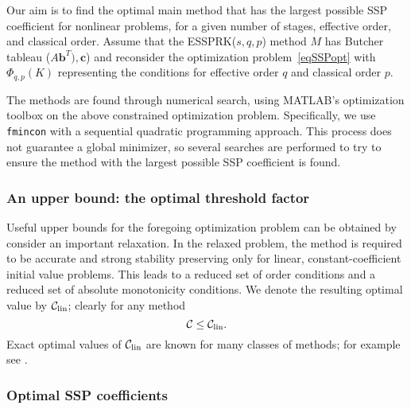 Our aim is to find the optimal main method that has the largest possible
SSP coefficient for nonlinear problems, for a given number of stages, effective order,
and classical order. 
Assume that the ESSPRK($s, q, p$) method \( M \) has Butcher tableau  ($A \bm{b}^T), \bm{c}$)
and reconsider the optimization problem~\eqref{eqSSPopt}
with \( \Phi_{q,p}(K) \) representing  the conditions for effective order $q$ and classical order $p$.

The methods are found through numerical search, using
\textsc{MATLAB}'s optimization toolbox on the above constrained
optimization problem.  Specifically, we use \verb"fmincon" with a
sequential quadratic programming approach.
This process does not guarantee a global minimizer, so several
searches are performed to try to ensure the method with the largest possible SSP coefficient is found.

\subsubsection{An upper bound: the optimal threshold factor}
Useful upper bounds for the foregoing optimization problem can be obtained
by consider an important relaxation.  In the relaxed problem, the method is
required to be accurate and strong stability preserving only for linear,
constant-coefficient initial value problems.  This leads to a reduced set of
order conditions and a reduced set of absolute monotonicity conditions.  We
denote the resulting optimal value by $\mathcal{C}_{\text{lin}}$; clearly for any method
$$\mathcal{C}\le\mathcal{C}_{\text{lin}}.$$
Exact optimal values of $\mathcal{C}_{\text{lin}}$ are known for many classes of methods; for example see
\cite{Kraaijevanger1986,ketcheson2009a}.



\subsubsection{Optimal SSP coefficients\label{subsection3.1.2}}

